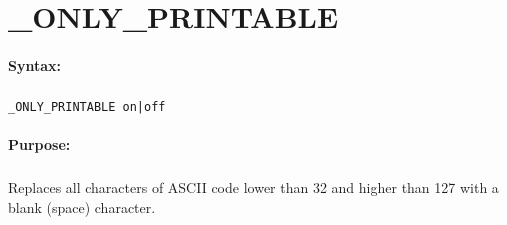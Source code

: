 
\newpage
\section{\_ONLY\_PRINTABLE}
\label{cmd:_ONLY_PRINTABLE}

\paragraph{Syntax:}
\subparagraph{}
\texttt{\_ONLY\_PRINTABLE on|off}

\paragraph{Purpose:}
\subparagraph{}
Replaces all characters of ASCII code lower than 32 and 
higher than 127 with a blank (space) character.

